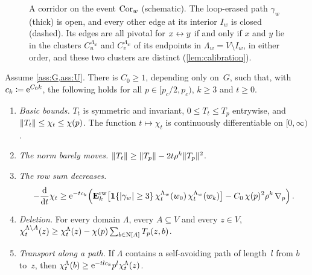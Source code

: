 \begin{figure}[ht]
\centering

\caption{A corridor on the event $\mathrm{Cor}_w$ (schematic). The loop-erased path $\gamma_w$ (thick) is
open, and every other edge at its interior $I_w$ is closed (dashed). Its edges are all pivotal for
$x\leftrightarrow y$ if and only if $x$ and $y$ lie in the clusters $C_u^{\Lambda_w}$ and $C_v^{\Lambda_w}$ of its
endpoints in $\Lambda_w=V\setminus I_w$, in either order, and these two clusters are distinct
(\cref{lem:calibration}).}\label{fig:corridor}
\end{figure}

\begin{proposition}\label{prop:deformation}
Assume \cref{ass:G,ass:U}. There is $C_0\ge1$, depending only on~$G$, such that, with
$c_k\coloneqq\mathrm{e}^{C_0k}$, the following holds for all $p\in[p_c/2,p_c)$, $k\ge3$ and $t\ge0$.
\begin{enumerate}[label=\textup{(\alph*)}]
  \item\label{it:def-basic} \emph{Basic bounds.} $T_t$ is symmetric and invariant,
  $0\le T_t\le T_p$ entrywise, and $\lVert T_t\rVert\le\chi_t\le\chi(p)$. The function $t\mapsto\chi_t$ is
  continuously differentiable on $[0,\infty)$.
  \item\label{it:def-norm} \emph{The norm barely moves.}
  $\lVert T_t\rVert\ge\lVert T_p\rVert-2t\rho^k\lVert T_p\rVert^2$.
  \item\label{it:def-rate} \emph{The row sum decreases.}
  \begin{equation*}
    -\frac{\d}{\d t}\chi_t\ge\e^{-tc_k}\Bigl(\Erw\bigl[\1\{\abs{\gamma_w}\ge3\}\,
    \chi^{\Lambda_w}_t(w_0)\,\chi^{\Lambda_w}_t(w_k)\bigr]-C_0\,\chi(p)^2\rho^k\,\nabla_p\Bigr)\,.
  \end{equation*}
  \item\label{it:def-deletion} \emph{Deletion.} For every domain $\Lambda$, every $A\subseteq V$ and
  every $z\in V$,
  $\chi^{\Lambda\setminus A}_t(z)\ge\chi^\Lambda_t(z)-\chi(p)\sum_{b\in\mathrm{N}[A]}T_p(z,b)$.
  \item\label{it:def-path} \emph{Transport along a path.} If $\Lambda$ contains a self-avoiding path
  of length~$l$ from $b$ to~$z$, then $\chi^\Lambda_t(b)\ge\mathrm{e}^{-tlc_k}p^l\chi^\Lambda_t(z)$.
\end{enumerate}
\end{proposition}

